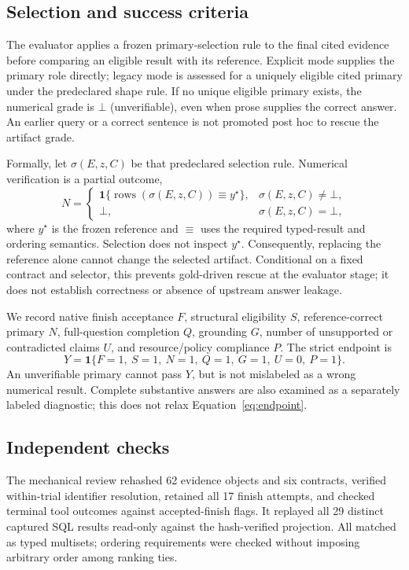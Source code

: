 \documentclass{article}
\newcommand{\ind}{\mathbf{1}}
\newcommand{\botval}{\bot}
\begin{document}
\subsection{Selection and success criteria}
The evaluator applies a frozen primary-selection rule to the final cited evidence before comparing an eligible result with its reference. Explicit mode supplies the primary role directly; legacy mode is assessed for a uniquely eligible cited primary under the predeclared shape rule. If no unique eligible primary exists, the numerical grade is $\botval$ (unverifiable), even when prose supplies the correct answer. An earlier query or a correct sentence is not promoted post hoc to rescue the artifact grade.

Formally, let $\sigma(E,z,C)$ be that predeclared selection rule. Numerical verification is a partial outcome,
\begin{equation}
N=\begin{cases}
\ind\{\operatorname{rows}(\sigma(E,z,C))\equiv y^\star\}, & \sigma(E,z,C)\ne\botval,\\
\botval, & \sigma(E,z,C)=\botval,
\end{cases}
\label{eq:numerical}
\end{equation}
where $y^\star$ is the frozen reference and $\equiv$ uses the required typed-result and ordering semantics. Selection does not inspect $y^\star$. Consequently, replacing the reference alone cannot change the selected artifact. Conditional on a fixed contract and selector, this prevents gold-driven rescue at the evaluator stage; it does not establish correctness or absence of upstream answer leakage.

We record native finish acceptance $F$, structural eligibility $S$, reference-correct primary $N$, full-question completion $Q$, grounding $G$, number of unsupported or contradicted claims $U$, and resource/policy compliance $P$. The strict endpoint is
\begin{equation}
Y=\ind\{F=1,\ S=1,\ N=1,\ Q=1,\ G=1,\ U=0,\ P=1\}.
\label{eq:endpoint}
\end{equation}
An unverifiable primary cannot pass $Y$, but is not mislabeled as a wrong numerical result. Complete substantive answers are also examined as a separately labeled diagnostic; this does not relax Equation~\eqref{eq:endpoint}.

\subsection{Independent checks}
The mechanical review rehashed 62 evidence objects and six contracts, verified within-trial identifier resolution, retained all 17 finish attempts, and checked terminal tool outcomes against accepted-finish flags. It replayed all 29 distinct captured SQL results read-only against the hash-verified projection. All matched as typed multisets; ordering requirements were checked without imposing arbitrary order among ranking ties.
\end{document}
